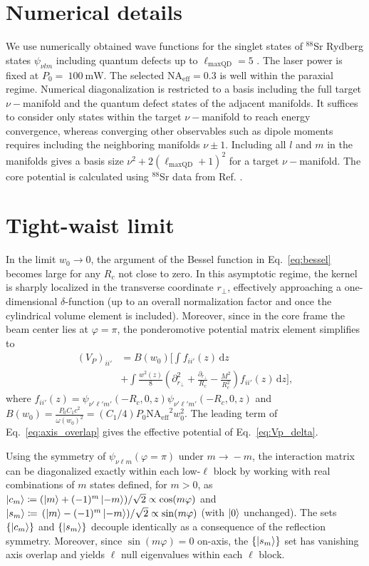 \documentclass[aps,prl,groupedaddress,superscriptaddress,twocolumn,10pt,longbibliography]{revtex4-2}
\begin{document}
\section{Numerical details}

We use numerically obtained wave functions for the singlet states of $^{88}$Sr Rydberg states $\psi_{\nu l m}$ including quantum defects up to $\ell_{\mathrm{maxQD}}=5$ \cite{Patsch2021}. The laser power is fixed at $P_0=~100~\mathrm{mW}$. The selected $\mathrm{NA_{eff}}= 0.3$ is well within the paraxial regime. Numerical diagonalization is restricted to a basis including the full target $\nu-$manifold and the quantum defect states of the adjacent manifolds. It suffices to consider only states within the target $\nu-$manifold to reach energy convergence, whereas converging other observables such as dipole moments requires including the neighboring manifolds $\nu \pm1$. Including all $l$ and $m$ in the manifolds gives a basis size $\nu^2+2(\ell_{\mathrm{maxQD}}+1)^2$ for a target $\nu-$manifold. The core potential is calculated using $^{88}$Sr data from Ref. \cite{Kiruga2025}.

\section{Tight-waist limit}
In the limit $w_0  \! \to \! 0$, the argument of the Bessel function in Eq.~\ref{eq:bessel} becomes large for any $R_c$ not close to zero. In this asymptotic regime, the kernel is sharply localized in the transverse coordinate $r_\perp$, effectively approaching a one-dimensional $\delta$-function (up to an overall normalization factor and once the cylindrical volume element is included). Moreover, since in the core frame the beam center lies at $\varphi=\pi$, the ponderomotive potential matrix element simplifies to
\begin{align}
\label{eq:axis_overlap}
(V_P)_{ii'} &=B(w_0)\Big[
\int f_{ii'}(z) \, \mathrm{d}z
\\&+ \int  \frac{w^2(z)}{8} \! \left(\!\partial_{r_{\perp}}^2\!+\!\frac{\partial_{r_{\perp}}}
{R_c} \!-\!\frac{M^2}{R_c^2}\right)  f_{ii'}(z) \, \mathrm{d}z \Big],
\nonumber
\end{align}
where  $f_{ii'}(z)=\psi_{\nu'\ell' m'}(-\!R_c,\!0,\!z)\psi_{\nu'\ell' m'}(-\!R_c,\!0,\!z)$ and $B(w_0)=\frac{P_0 C_1 c^2}{\omega(w_0)^2}=(C_1/4)P_0 \mathrm{NA_{eff}}^2 w_0^2$. The leading term of Eq.~\eqref{eq:axis_overlap} gives the effective potential of Eq.~\eqref{eq:Vp_delta}.

Using the symmetry of $\psi_{\nu \ell m}(\varphi\!=\!\pi)$ under $m \!\to \! -m$, the interaction matrix can be diagonalized exactly within each low-$\ell$ block by working with real combinations of $m$ states defined, for  $m{>}0$, as $\ket{c_m}\coloneqq(\ket{m}+(-1)^m\ket{-m})/\sqrt2 \propto \cos(m\varphi)$ and $\ket{s_m}\coloneqq  \, (\ket{m}-(-1)^m\ket{-m})/\sqrt2 \propto \sin(m\varphi)$ (with $\ket{0}$ unchanged). The sets $\lbrace \ket {c_m}\rbrace$ and $\lbrace \ket {s_m}\rbrace$ decouple identically as a consequence of the reflection symmetry. Moreover, since $\sin(m\varphi){=}0$ on-axis,  the $\lbrace \ket{s_m} \rbrace$ set has vanishing axis overlap and yields $\ell$ null eigenvalues
within each $\ell$ block.
\end{document}
